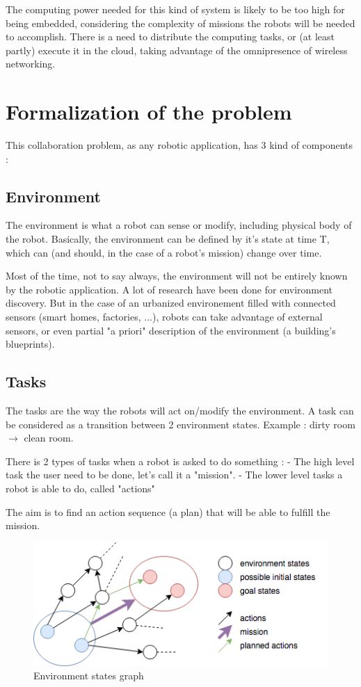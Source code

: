 \documentclass[conference]{IEEEtran}
\begin{document}
The computing power needed for this kind of system is likely to be too high for being embedded, considering the complexity of missions the robots will be needed to accomplish.
There is a need to distribute the computing tasks, or (at least partly) execute it in the cloud, taking advantage of the omnipresence of wireless networking.

\section{Formalization of the problem}

This collaboration problem, as any robotic application, has 3 kind of components : 

\subsection{Environment}

The environment is what a robot can sense or modify, including physical body of the robot.
Basically, the environment can be defined by it's state at time T, which can (and should, in the case of a robot's mission) change over time.

Most of the time, not to say always, the environment will not be entirely known by the robotic application.
A lot of research have been done for environment discovery.
But in the case of an urbanized environement filled with connected sensors (smart homes, factories, ...), robots can take advantage of external sensors, or even partial "a priori" description of the environment (a building's blueprints).

\subsection{Tasks}

The tasks are the way the robots will act on/modify the environment.
A task can be considered as a transition between 2 environment states.
Example : dirty room $\rightarrow$ clean room.

There is 2 types of tasks when a robot is asked to do something : 
 - The high level task the user need to be done, let's call it a "mission".
 - The lower level tasks a robot is able to do, called "actions"

The aim is to find an action sequence (a plan) that will be able to fulfill the mission.

\begin{figure}
  \centering
  \caption{\label{env_graph}Environment states graph}
  \includegraphics[scale=0.40]{img/env_graph}
\end{figure}
\end{document}
